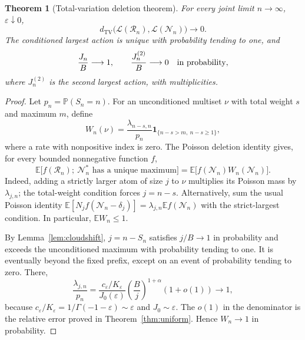 \documentclass[11pt,a4paper]{article}
\newtheorem{theorem}{Theorem}[section]
\theoremstyle{definition}\newtheorem{definition}[theorem]{Definition}
\theoremstyle{remark}\newtheorem{remark}[theorem]{Remark}
\newcommand{\eps}{\varepsilon}
\newcommand{\Prob}{\mathbb P}
\newcommand{\E}{\mathbb E}
\newcommand{\TV}{d_{\mathrm{TV}}}
\newcommand{\Law}{\mathcal L}
\newcommand{\1}{\mathbf 1}
\begin{document}
\begin{theorem}[Total-variation deletion theorem]\label{thm:deletion}
For every joint limit $n\to\infty$, $\eps\downarrow0$,
\begin{equation}\label{eq:TV}
 \TV\bigl(\Law(\mathcal R_n),\Law(\mathcal N_n)\bigr)\longrightarrow0.
\end{equation}
The conditioned largest action is unique with probability tending to
one, and
\begin{equation}\label{eq:Jfirst}
 \frac{J_n}{B}\longrightarrow1,
 \qquad \frac{J_n^{(2)}}B\longrightarrow0
 \quad\hbox{in probability},
\end{equation}
where $J_n^{(2)}$ is the second largest action, with multiplicities.
\end{theorem}
\begin{proof}
Let $p_n=\Prob(S_n=n)$. For an unconditioned multiset $\nu$ with total
weight $s$ and maximum $m$, define
\begin{equation}\label{eq:density}
 W_n(\nu)=\frac{\lambda_{n-s,n}}{p_n}
          \1_{\{n-s>m,\ n-s\ge1\}},
\end{equation}
where a rate with nonpositive index is zero. The Poisson deletion
identity gives, for every bounded nonnegative function $f$,
\begin{equation}\label{eq:Mecke}
 \E\bigl[f(\mathcal R_n);\ \mathcal N_n^*\text{ has a unique maximum}\bigr]
 =\E\bigl[f(\mathcal N_n)W_n(\mathcal N_n)\bigr].
\end{equation}
Indeed, adding a strictly larger atom of size $j$ to $\nu$ multiplies its
Poisson mass by $\lambda_{j,n}$; the total-weight condition forces
$j=n-s$. Alternatively, sum the usual Poisson identity
$\E[N_jf(\mathcal N_n-\delta_j)]=\lambda_{j,n}\E f(\mathcal N_n)$
with the strict-largest condition. In particular, $\E W_n\le1$.

By Lemma~\ref{lem:cloudshift}, $j=n-S_n$ satisfies $j/B\to1$ in
probability and exceeds the unconditioned maximum with probability
 tending to one. It is eventually beyond the fixed prefix, except on an
event of probability tending to zero. There,
\begin{equation}\label{eq:ratequotient}
 \frac{\lambda_{j,n}}{p_n}
 =\frac{c_{\eps}/K_{\eps}}{J_0(\eps)}
   \left(\frac Bj\right)^{1+\alpha}(1+o(1))
 \longrightarrow1,
\end{equation}
because $c_{\eps}/K_{\eps}=1/\Gamma(-1-\eps)\sim\eps$ and
$J_0\sim\eps$. The $o(1)$ in the denominator is the relative error
proved in Theorem~\ref{thm:uniform}. Hence $W_n\to1$ in probability.


\end{proof}
\end{document}
